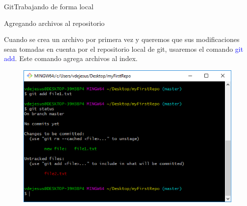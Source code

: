 \documentclass[10pt]{beamer}
\begin{document}
\begin{frame}{Git}{Trabajando de forma local}

\begin{block}{Agregando archivos al repositorio}

Cuando se crea un archivo por primera vez y queremos que sus modificaciones sean tomadas en cuenta por el repositorio local de git, usaremos el comando \textcolor{blue}{git add}. Este comando agrega archivos al index. 

\begin{figure}[h!]
\centering
\includegraphics [scale=0.5]{step3}
\label{fig:gitstatus}
\end{figure}

\end{block}

\end{frame}
\end{document}
